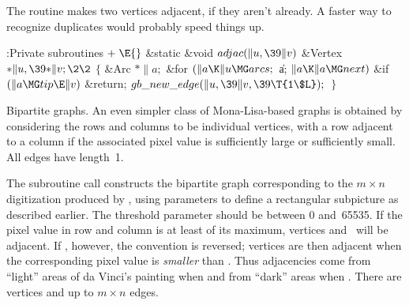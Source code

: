 The  routine makes two vertices adjacent, if they aren't
already.
A faster way to recognize duplicates would probably speed things up.

\Y\B\4:Private subroutines\X${}\mathrel+\E{}$\6
\1\1\&{static} \&{void} ${}\\{adjac}(\|u,\39\|v){}$\6
\&{Vertex} ${}{*}\|u,\39{*}\|v;\2\2{}$\6
${}\{{}$\5
\1\&{Arc} ${}{*}\|a;{}$\7
\&{for} ${}(\|a\K\|u\MG\\{arcs};{}$ \|a; ${}\|a\K\|a\MG\\{next}){}$\1\6
\&{if} ${}(\|a\MG\\{tip}\E\|v){}$\1\5
\&{return};\2\2\6
${}\\{gb\_new\_edge}(\|u,\39\|v,\39\T{1\$L});{}$\6
\4${}\}{}$\2\par
\fi

Bipartite graphs. An even simpler class of Mona-Lisa-based graphs
is obtained by considering the  rows and  columns to be
individual
vertices, with a row adjacent to a column if the associated pixel value
is sufficiently large or sufficiently small. All edges have length~1.

The subroutine call  constructs
the bipartite graph corresponding to the $m\times n$
digitization produced by , using parameters  to
define a rectangular subpicture as described earlier.
The threshold parameter  should be between 0 and~65535.
If the pixel value in row  and column  is at least  of
its maximum, vertices  and~ will be adjacent.
If , however, the convention is reversed; vertices are then
adjacent when the corresponding pixel value is {\sl smaller\/} than
. Thus adjacencies come from ``light'' areas of
da Vinci's painting when  and from ``dark'' areas when . There
are  vertices and up to $m\times n$ edges.

